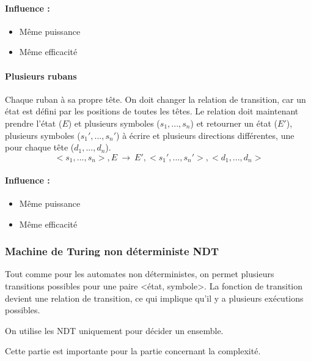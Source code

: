 \paragraph{Influence :} 
\begin{itemize}
	\item Même puissance
	\item Même efficacité
\end{itemize}

\paragraph{Plusieurs rubans} Chaque ruban à sa propre tête.
On doit changer la relation de transition, car un état est défini par les positions
de toutes les têtes. Le relation doit maintenant prendre l'état ($E$) et plusieurs 
symboles ($s_1,...,s_n$) et retourner un état ($E'$), plusieurs symboles 
($s_1',...,s_n'$) à écrire et plusieurs directions différentes, une pour chaque tête 
($d_1,...,d_n$).
$$ <s_1,...,s_n>, E \ \rightarrow \ E', <s_1',...,s_n'>, <d_1,...,d_n> $$
\paragraph{Influence :} 
\begin{itemize}
	\item Même puissance
	\item Même efficacité
\end{itemize}

\subsubsection{Machine de Turing non déterministe NDT}
Tout comme pour les automates non déterministes, on permet plusieurs 
transitions possibles pour une paire <état, symbole>. La fonction de transition
devient une relation de transition, ce qui implique qu'il y a plusieurs
 exécutions possibles.

\begin{myrem}
	On utilise les NDT uniquement pour décider un ensemble.
\end{myrem}

\begin{myrem}
	Cette partie est importante pour la partie concernant la complexité.
\end{myrem}

